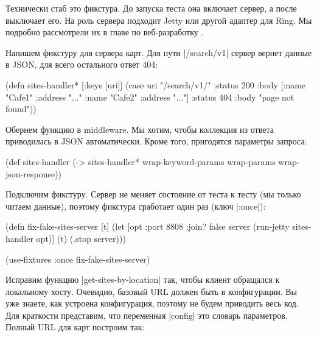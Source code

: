 Технически стаб это фикстура. До запуска теста она включает сервер, а после
выключает его. На роль сервера подходит Jetty или другой адаптер для Ring. Мы
подробно рассмотрели их в главе по веб-разработку .

Напишем фикстуру для сервера карт. Для пути \spverb|/search/v1| сервер вернет
данные в JSON, для всего остального ответ 404:

\label{sites-handler}

\begin{english}
  \begin{clojure}
(defn sites-handler* [{:keys [uri]}]
  (case uri
    "/search/v1/"
    {:status 200
     :body [{:name "Cafe1" :address "..."}
            {:name "Cafe2" :address "..."}]}
    {:status 404
     :body "page not found"}))
  \end{clojure}
\end{english}

Обернем функцию в middleware. Мы хотим, чтобы коллекция из ответа приводилась в
JSON автоматически. Кроме того, пригодятся параметры запроса:

\begin{english}
  \begin{clojure}
(def sites-handler
  (-> sites-handler*
      wrap-keyword-params
      wrap-params
      wrap-json-response))
  \end{clojure}
\end{english}

Подключим фикстуру. Сервер не меняет состояние от теста к тесту (мы только
читаем данные), поэтому фикстура сработает один раз (ключ \spverb|:once|):

\begin{english}
  \begin{clojure}
(defn fix-fake-sites-server [t]
  (let [opt {:port 8808 :join? false}
        server (run-jetty sites-handler opt)]
    (t)
    (.stop server)))

(use-fixtures :once fix-fake-sites-server)
  \end{clojure}
\end{english}

Исправим функцию \spverb|get-sites-by-location| так, чтобы клиент обращался к
локальному хосту. Очевидно, базовый URL должен быть в конфигурации. Вы уже
знаете, как устроена конфигурация, поэтому не будем приводить весь код. Для
краткости представим, что переменная \spverb|config| это словарь
параметров. Полный URL для карт построим так:

